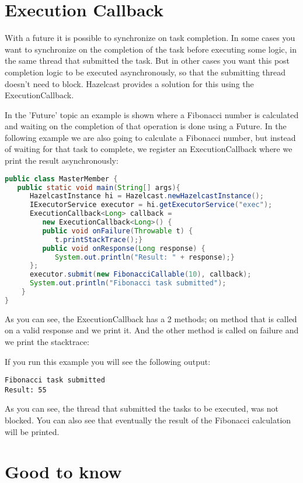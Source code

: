 \section{Execution Callback}
With a future it is possible to synchronize on task completion. In some cases you want to synchronize on the completion of the task before executing some logic, in the same thread that submitted the task. But in other cases you want this post completion logic to be executed asynchronously, so that the submitting thread doesn't need to block. Hazelcast provides a solution for this using the ExecutionCallback.

In the 'Future' topic an example is shown where a Fibonacci number is calculated and waiting on the completion of that operation is done using a Future. In the following example we are also going to calculate a Fibonacci number, but instead of waiting for that task to complete, we register an ExecutionCallback where we print the result asynchronously:
\begin{lstlisting}[language=java]
public class MasterMember {
   public static void main(String[] args){
      HazelcastInstance hi = Hazelcast.newHazelcastInstance();
      IExecutorService executor = hi.getExecutorService("exec");
      ExecutionCallback<Long> callback = 
         new ExecutionCallback<Long>() {
         public void onFailure(Throwable t) {
            t.printStackTrace();}
         public void onResponse(Long response) {
            System.out.println("Result: " + response);}
      };
      executor.submit(new FibonacciCallable(10), callback);
      System.out.println("Fibonacci task submitted");
    }
}
\end{lstlisting}
As you can see, the ExecutionCallback has a 2 methods; on method that is called on a valid response and we print it. And the other method is called on failure and we print the stacktrace: 

If you run this example you will see the following output:
\begin{lstlisting}
Fibonacci task submitted
Result: 55
\end{lstlisting}
As you can see, the thread that submitted the tasks to be executed, was not blocked. You can also see that eventually the result of the Fibonacci calculation will be printed. 

\section{Good to know}

